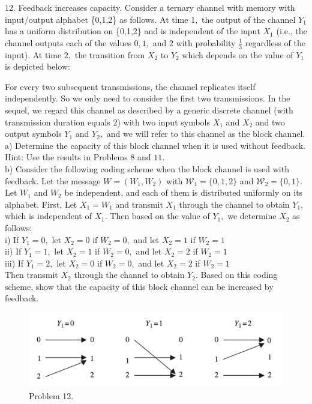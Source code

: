 \documentclass[8pt]{article}
\begin{document}
\begin{tcolorbox}
12. Feedback increases capacity. Consider a ternary channel with memory with input/output alphabet \{0,1,2\} as follows. At time $1,$ the output of the channel $Y_{1}$ has a uniform distribution on \{0,1,2\} and is independent of the input $X_{1}$ (i.e., the channel outputs each of the values $0,1,$ and 2 with probability $\frac{1}{3}$ regardless of the input). At time $2,$ the transition from $X_{2}$ to $Y_{2}$ which depends on the value of $Y_{1}$ is depicted below:

\vspace{10pt}

For every two subsequent transmissions, the channel replicates itself independently. So we only need to consider the first two transmissions. In the sequel, we regard this channel as described by a generic discrete channel (with transmission duration equals 2) with two input symbols $X_{1}$ and $X_{2}$ and two output symbols $Y_{1}$ and $Y_{2},$ and we will refer to this channel as the block channel.\\
a) Determine the capacity of this block channel when it is used without feedback. Hint: Use the results in Problems 8 and $11 .$\\
b) Consider the following coding scheme when the block channel is used with feedback. Let the message $W=\left(W_{1}, W_{2}\right)$ with $\mathcal{W}_{1}=\{0,1,2\}$ and $\mathcal{W}_{2}=\{0,1\} .$ Let $W_{1}$ and $W_{2}$ be independent, and each of them is distributed uniformly on its alphabet. First, Let $X_{1}=W_{1}$ and transmit $X_{1}$ through the channel to obtain $Y_{1},$ which is independent of $X_{1} .$ Then based on the value of $Y_{1},$ we determine $X_{2}$ as follows:\\
i) If $Y_{1}=0,$ let $X_{2}=0$ if $W_{2}=0,$ and let $X_{2}=1$ if $W_{2}=1$\\
ii) If $Y_{1}=1,$ let $X_{2}=1$ if $W_{2}=0,$ and let $X_{2}=2$ if $W_{2}=1$ \\
iii) If $Y_{1}=2,$ let $X_{2}=0$ if $W_{2}=0,$ and let $X_{2}=2$ if $W_{2}=1$ \\
Then transmit $X_{2}$ through the channel to obtain $Y_{2}$. Based on this coding scheme, show that the capacity of this block channel can be increased by feedback.
\end{tcolorbox}
\begin{figure}[!h]
	\centering
	\includegraphics[width=0.5\linewidth]{imgs/hw7_12.png}
	\caption{Problem 12.}
\end{figure}

\newpage
\
\end{document}
